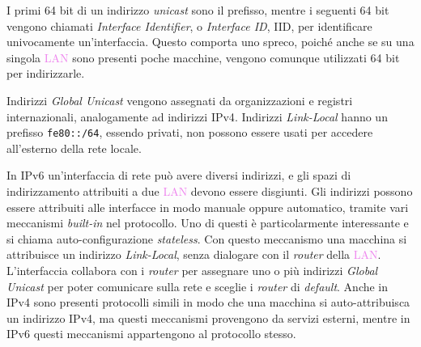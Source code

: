\documentclass{article}
\numberwithin{equation}{subsection}
\begin{document}
I primi 64 bit di un indirizzo \textit{unicast} sono il prefisso, mentre i seguenti 64 bit vengono chiamati \textit{Interface Identifier}, o \textit{Interface ID}, IID, per identificare univocamente un'interfaccia. 
Questo comporta uno spreco, poiché anche se su una singola \textcolor{violet}{LAN} sono presenti poche macchine, vengono comunque utilizzati 64 bit per indirizzarle. 

Indirizzi \textit{Global Unicast} vengono assegnati da organizzazioni e registri internazionali, analogamente ad indirizzi \textcolor{BurntOrange}{IPv4}. 
Indirizzi \textit{Link-Local} hanno un prefisso \texttt{fe80::/64}, essendo privati, non possono essere usati per accedere all'esterno della rete locale. 


In \textcolor{OliveGreen}{IPv6} un'interfaccia di rete può avere diversi indirizzi, e gli spazi di indirizzamento attribuiti a due \textcolor{violet}{LAN} devono essere disgiunti. Gli indirizzi possono 
essere attribuiti alle interfacce in modo manuale oppure automatico, tramite vari meccanismi \textit{built-in} nel protocollo. Uno di questi 
è particolarmente interessante e si chiama auto-configurazione \textit{stateless}. 
Con questo meccanismo una macchina si attribuisce un indirizzo \textit{Link-Local}, senza dialogare con il \textit{router} della \textcolor{violet}{LAN}. L'interfaccia collabora con i 
\textit{router} per assegnare uno o più indirizzi \textit{Global Unicast} per poter comunicare sulla rete e sceglie i \textit{router} di \textit{default}. 
Anche in \textcolor{BurntOrange}{IPv4} sono presenti protocolli simili in modo che una macchina si auto-attribuisca un indirizzo \textcolor{BurntOrange}{IPv4}, ma questi meccanismi provengono da servizi esterni, mentre in \textcolor{OliveGreen}{IPv6} 
questi meccanismi appartengono al protocollo stesso. 
\end{document}

